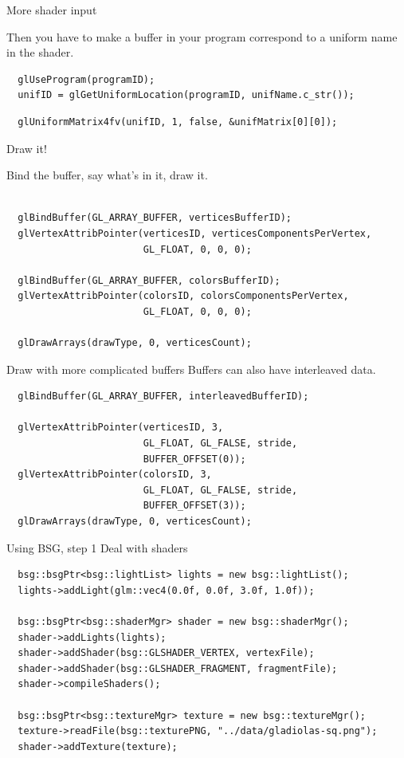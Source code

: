 \documentclass[12pt]{article}
\begin{document}
\begin{frame}[fragile]{More shader input}

Then you have to make a buffer in your program correspond to a uniform
name in the shader.

\begin{verbatim}
  glUseProgram(programID);
  unifID = glGetUniformLocation(programID, unifName.c_str());
\end{verbatim}


\begin{verbatim}
  glUniformMatrix4fv(unifID, 1, false, &unifMatrix[0][0]);
\end{verbatim}
\end{frame}

\begin{frame}[fragile]{Draw it!}

Bind the buffer, say what's in it, draw it.

\begin{verbatim}

  glBindBuffer(GL_ARRAY_BUFFER, verticesBufferID);
  glVertexAttribPointer(verticesID, verticesComponentsPerVertex,
                        GL_FLOAT, 0, 0, 0);

  glBindBuffer(GL_ARRAY_BUFFER, colorsBufferID);
  glVertexAttribPointer(colorsID, colorsComponentsPerVertex,
                        GL_FLOAT, 0, 0, 0);

  glDrawArrays(drawType, 0, verticesCount);
\end{verbatim}
\end{frame}

\begin{frame}[fragile]{Draw with more complicated buffers}
Buffers can also have interleaved data.

\begin{verbatim}
  glBindBuffer(GL_ARRAY_BUFFER, interleavedBufferID);

  glVertexAttribPointer(verticesID, 3,
                        GL_FLOAT, GL_FALSE, stride,
                        BUFFER_OFFSET(0));
  glVertexAttribPointer(colorsID, 3,
                        GL_FLOAT, GL_FALSE, stride,
                        BUFFER_OFFSET(3));
  glDrawArrays(drawType, 0, verticesCount);
\end{verbatim}
\end{frame}

\begin{frame}[fragile]{Using BSG, step 1}
Deal with shaders

\begin{verbatim}
  bsg::bsgPtr<bsg::lightList> lights = new bsg::lightList();
  lights->addLight(glm::vec4(0.0f, 0.0f, 3.0f, 1.0f));

  bsg::bsgPtr<bsg::shaderMgr> shader = new bsg::shaderMgr();
  shader->addLights(lights);
  shader->addShader(bsg::GLSHADER_VERTEX, vertexFile);
  shader->addShader(bsg::GLSHADER_FRAGMENT, fragmentFile);
  shader->compileShaders();

  bsg::bsgPtr<bsg::textureMgr> texture = new bsg::textureMgr();
  texture->readFile(bsg::texturePNG, "../data/gladiolas-sq.png");
  shader->addTexture(texture);
\end{verbatim}
\end{frame}
\end{document}
